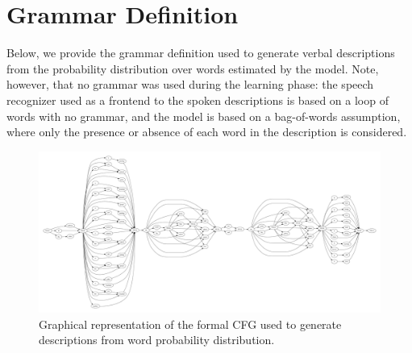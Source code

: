 \section{Grammar Definition}
\label{appendix:grammar}
Below, we provide the grammar definition used to generate verbal descriptions from the probability distribution over words estimated by the model.
Note, however, that no grammar was used during the learning phase: the speech recognizer used as a frontend to the spoken descriptions is based on a loop of words with no grammar, and the \AffWords{} model is based on a bag-of-words assumption, where only the presence or absence of each word in the description is considered.

\begin{figure}
  \includegraphics[width=\textwidth, angle=90]{figures/grammar}
  \caption{Graphical representation of the formal \acf{CFG} used to generate descriptions from word probability distribution.}
\end{figure}


